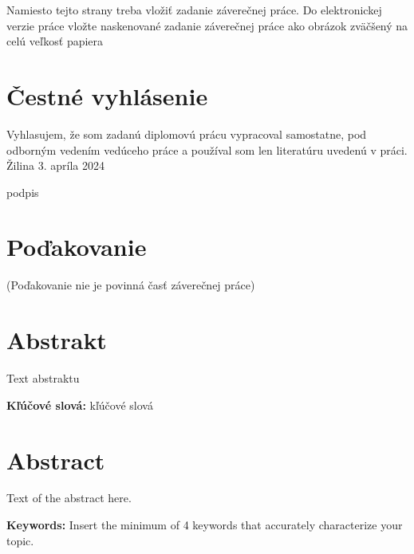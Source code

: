 \newpage %
\thispagestyle{empty}
\begingroup
\begin{LARGE}
	Namiesto tejto strany treba vložiť zadanie záverečnej práce.
	Do elektronickej verzie práce vložte naskenované zadanie záverečnej práce ako obrázok zväčšený na celú veľkosť papiera
\end{LARGE}
\endgroup

\newpage %
\pagestyle{fancy}
\mbox{}
\vfill
\section*{Čestné vyhlásenie}
Vyhlasujem, že som zadanú diplomovú prácu vypracoval samostatne, pod \nobreak odborným vedením vedúceho práce a používal som len literatúru uvedenú v práci.
\vspace*{0.25cm}
\\Žilina 3. apríla 2024

\vspace*{.5cm}
\null\hfill podpis

\newpage %
\mbox{}
\vfill
\section*{Poďakovanie}
(Poďakovanie nie je povinná časť záverečnej práce)
\vspace{3cm}

\newpage %
\section*{Abstrakt}

Text abstraktu

\vspace{0.5cm}
\noindent\textbf{Kľúčové slová:} kľúčové slová \\

\section*{Abstract}

Text of the abstract here.

\vspace{0.5cm}
\noindent\textbf{Keywords:} Insert the minimum of 4 keywords that accurately characterize your topic.
